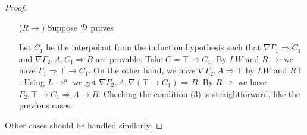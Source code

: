 \begin{proof}
\begin{enumerate}
	\item[($R \rightarrow$)] Suppose $\D$ proves
	\begin{prooftree}
  \end{prooftree}
  Let $C_1$ be the interpolant from the induction hypothesis such that $\nabla \Gamma_1 \Rightarrow C_1$ and $\nabla \Gamma_2, A, C_1 \Rightarrow B$ are provable. Take $C = \top \rightarrow C_1$. By $LW$ and $R \rightarrow$ we have $\Gamma_1 \Rightarrow \top \rightarrow C_1$. On the other hand, we have $\nabla \Gamma_2, A \Rightarrow \top$ by $LW$ and $R \top$. Using $L \rightarrow ^n$ we get $\nabla \Gamma_2, A, \nabla (\top \rightarrow C_1) \Rightarrow B$. By $R \rightarrow$ we have $\Gamma_2, \top \rightarrow C_1 \Rightarrow A \rightarrow B$. Checking the condition (3) is straightforward, like the previous cases.
\end{enumerate}

Other cases should be handled similarly.
\end{proof}